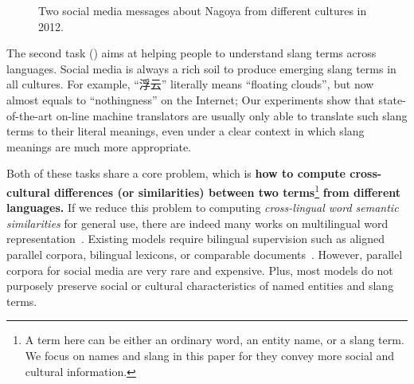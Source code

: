 \begin{figure}[h]
	\centering
	\caption{Two social media messages about Nagoya from different cultures in 2012. \vspace{-10pt}}
	\label{fig:intro}
\end{figure}

The second task () aims at helping people to understand slang terms across languages. 
Social media is always a rich soil to produce emerging slang 
terms in all cultures. 
For example, ``浮云'' literally means ``floating clouds'', 
but now almost equals to ``nothingness'' on the Internet; 
Our experiments show that state-of-the-art on-line machine translators are usually
only able to translate such slang terms to their literal meanings, 
even under a clear context in which slang meanings are much more appropriate.

Both of these tasks share a core problem, which is \textbf{how to compute 
cross-cultural differences (or similarities) between two terms}\footnote{{A term here can be either an ordinary word, an entity name, or a slang term. We focus on names and slang in this paper for they convey more social and cultural information.}}\textbf{ from 
different languages.} 
If we reduce this problem to computing \textit{cross-lingual word semantic similarities}\cite{CamachoCollados2017SemEval2017T2} for general use, 
there are indeed many works on multilingual word representation~\cite{DBLP:journals/corr/Ruder17}. 
Existing models require bilingual supervision such as
aligned parallel corpora, bilingual lexicons, or 
comparable documents~\cite{upadhyay2016cross}.
However, parallel corpora for social media are very rare and expensive. 
Plus, most models do not purposely preserve 
social or cultural characteristics of named entities and slang terms.

